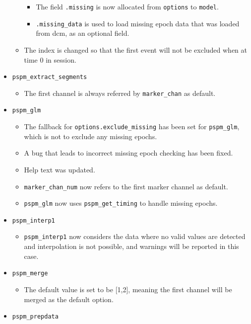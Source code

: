 \documentclass[english]{article}
\numberwithin{equation}{section}
\numberwithin{figure}{section}
\begin{document}
\begin{itemize}
\begin{itemize}
    		\begin{itemize}
    			\item The field \texttt{.missing} is now allocated from \texttt{options} to \texttt{model}.
    			\item \texttt{.missing\_data} is used to load missing epoch data that was loaded from dcm, as an optional field.
    		\end{itemize}
    		\item The index is changed so that the first event will not be excluded when at time 0 in session.
    	\end{itemize}
    	\item \texttt{pspm\_extract\_segments}
    	\begin{itemize}
    		\item The first channel is always referred by \texttt{marker\_chan} as default.
    	\end{itemize}
    	\item \texttt{pspm\_glm}
    	\begin{itemize}
    		\item The fallback for \texttt{options.exclude\_missing} has been set for \texttt{pspm\_glm}, which is not to exclude any missing epochs.
    		\item A bug that leads to incorrect missing epoch checking has been fixed.
    		\item Help text was updated.
    		\item \texttt{marker\_chan\_num} now refers to the first marker channel as default.
    		\item \texttt{pspm\_glm} now uses \texttt{pspm\_get\_timing} to handle missing epochs.
    	\end{itemize}
    	\item \texttt{pspm\_interp1}
    	\begin{itemize}
    		\item \texttt{pspm\_interp1} now considers the data where no valid values are detected and interpolation is not possible, and warnings will be reported in this case.
    	\end{itemize}
    	\item \texttt{pspm\_merge}
    	\begin{itemize}
    		\item The default value is set to be [1,2], meaning the first channel will be merged as the default option.
    	\end{itemize}
    	\item \texttt{pspm\_prepdata}

\end{itemize}
\end{document}
